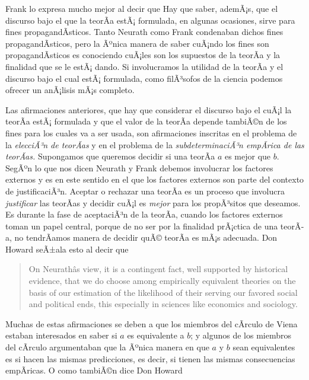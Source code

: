 Frank lo expresa mucho mejor al decir que  \parencite[p.~4]{Frank1956}
Hay que saber, ademÃ¡s, que el discurso bajo el que la teorÃ­a estÃ¡ formulada, en algunas ocasiones, sirve para fines propagandÃ­sticos.
Tanto Neurath como Frank condenaban dichos fines propagandÃ­sticos, pero la Ãºnica manera de saber cuÃ¡ndo los fines son propagandÃ­sticos es conociendo cuÃ¡les son los supuestos de la teorÃ­a y la finalidad que se le estÃ¡ dando.
Si involucramos la utilidad de la teorÃ­a y el discurso bajo el cual estÃ¡ formulada, como filÃ³sofos de la ciencia podemos ofrecer un anÃ¡lisis mÃ¡s completo.

Las afirmaciones anteriores, que hay que considerar el discurso bajo el cuÃ¡l la teorÃ­a estÃ¡ formulada y que el valor de la teorÃ­a depende tambiÃ©n de los fines para los cuales va a ser usada, son afirmaciones inscritas en el problema de la \emph{elecciÃ³n de teorÃ­as} y en el problema de la \emph{subdeterminaciÃ³n empÃ­rica de las teorÃ­as.}
Supongamos que queremos decidir si una teorÃ­a $a$ es mejor que $b$. 
SegÃºn lo que nos dicen Neurath y Frank debemos involucrar los factores externos y es en este sentido en el que los factores externos son parte del contexto de justificaciÃ³n.
Aceptar o rechazar una teorÃ­a es un proceso que involucra \emph{justificar} las teorÃ­as y decidir cuÃ¡l es \emph{mejor} para los propÃ³sitos que deseamos.
Es durante la fase de aceptaciÃ³n de la teorÃ­a, cuando los factores externos toman un papel central, porque de no ser por la finalidad prÃ¡ctica de una teorÃ­a, no tendrÃ­amos manera de decidir quÃ© teorÃ­a es mÃ¡s adecuada.
Don Howard seÃ±ala esto al decir que 

\begin{quote}
	On Neurathâs view, it is a contingent fact, well supported by historical evidence, that we do choose among empirically equivalent theories on the basis of our estimation of the likelihood of their serving our favored social and political ends, this especially in sciences like economics and sociology. \parencite[p.~5]{Howard2006}
\end{quote}

Muchas de estas afirmaciones se deben a que los miembros del cÃ­rculo de Viena estaban interesados en saber si $a$ es equivalente a $b$;
y algunos de los miembros del cÃ­rculo argumentaban que la Ãºnica manera en que $a$ y $b$ sean equivalentes es si hacen las mismas predicciones, es decir, si tienen las mismas consecuencias empÃ­ricas.
O como tambiÃ©n dice Don Howard

